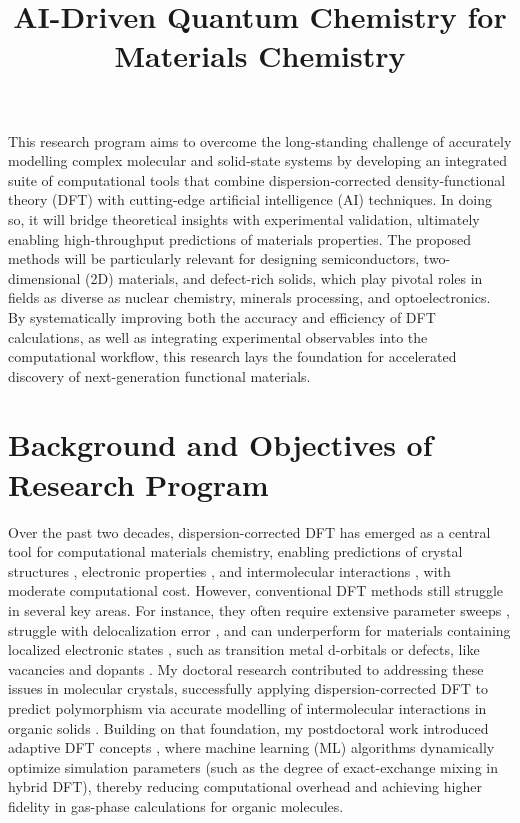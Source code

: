 \documentclass[11pt,english,calcwidth,compact]{nserc-appendix}
\begin{document}
\title{AI-Driven Quantum Chemistry for Materials Chemistry}

\setcounter{page}{1}
\maketitle

This research program aims to overcome the long-standing challenge of accurately modelling complex molecular and solid-state systems by developing an integrated suite of computational tools that combine dispersion‐corrected density-functional theory (DFT) with cutting-edge artificial intelligence (AI) techniques. In doing so, it will bridge theoretical insights with experimental validation, ultimately enabling high-throughput predictions of materials properties. The proposed methods will be particularly relevant for designing semiconductors, two-dimensional (2D) materials, and defect-rich solids, which play pivotal roles in fields as diverse as nuclear chemistry, minerals processing, and optoelectronics. By systematically improving both the accuracy and efficiency of DFT calculations, as well as integrating experimental observables into the computational workflow, this research lays the foundation for accelerated discovery of next-generation functional materials.

\section{Background and Objectives of Research Program}

Over the past two decades, dispersion-corrected DFT\cite{jcp-perspective,becke2014JCP,burke2012JCP} has emerged as a central tool for computational materials chemistry, enabling predictions of crystal structures \cite{moellmann2010importance, mayo2024assessment,BT7Rank}, electronic properties \cite{grimme2016dispersion}, and intermolecular interactions \cite{xdmaims}, with moderate computational cost. However, conventional DFT methods still struggle in several key areas. For instance, they often require extensive parameter sweeps \cite{gould2022poisoning,PhysRevX.15.011013,langreth1975exchange}, struggle with delocalization error \cite{wires}, and can underperform for materials containing localized electronic states \cite{yao2015efficient}, such as transition metal d-orbitals or defects, like vacancies and dopants \cite{sabino2022intrinsic}. My doctoral research contributed to addressing these issues in molecular crystals, successfully applying dispersion-corrected DFT to predict polymorphism via accurate modelling of intermolecular interactions in organic solids \cite{xdmaims,aimscsp}. Building on that foundation, my postdoctoral work introduced adaptive DFT concepts \cite{apbe0}, where machine learning (ML) algorithms dynamically optimize simulation parameters (such as the degree of exact-exchange mixing in hybrid DFT), thereby reducing computational overhead and achieving higher fidelity in gas-phase calculations for organic molecules.
\end{document}
